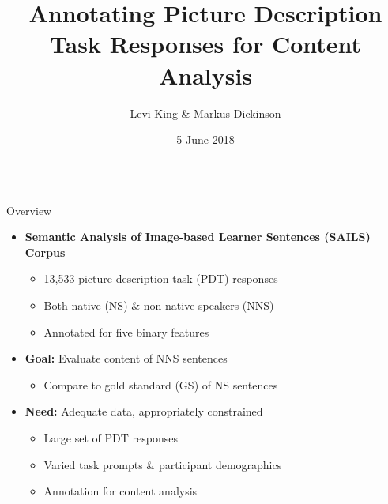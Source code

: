 \documentclass[final,14pt,t]{beamer}
\title[]{Annotating Picture Description Task Responses for Content Analysis}
\author[]{Levi King \& Markus Dickinson}
\institute[]{Indiana University}
\date[]{5 June 2018}
\begin{document}
\begin{frame}{}
  \begin{columns}[t]
    \begin{column}{.33\linewidth}
\begin{minipage}[t][\textheight]{\linewidth} 

\vspace{-1.7em}
\begin{block}{Overview}
\begin{center}
\begin{minipage}{.85\textwidth}

\vspace{.6em}
  \begin{itemize}
    \itemsep1em
  \item{\textbf{Semantic Analysis of Image-based Learner Sentences (SAILS) Corpus}
   \medskip
	\begin{itemize}
   \item 13,533 picture description task (PDT) responses
   \item Both native (NS) \& non-native speakers (NNS)
   \item Annotated for five binary features
      \end{itemize}
    }
\end{itemize}

\vspace{.6em}

  \begin{itemize}
    \itemsep1em
  \item{\textbf{Goal:} Evaluate content of NNS sentences 
      \begin{itemize}
      \item Compare to gold standard (GS) of NS sentences
      \end{itemize}
    }
\end{itemize}

\vspace{.6em}

  \begin{itemize}
    \itemsep1em
  \item{\textbf{Need:}  Adequate data, appropriately constrained
        \begin{itemize}
      \item Large set of PDT responses %
      \item Varied task prompts \& participant demographics %
      \item Annotation for content analysis
      \end{itemize}
    }
\end{itemize}


\end{minipage}
\end{center}
\end{block}
\end{minipage}
\end{column}
\end{columns}
\end{frame}
\end{document}
